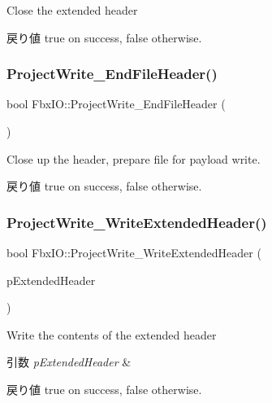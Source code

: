 Close the extended header \begin{DoxyReturn}{戻り値}
{\ttfamily true} on success, {\ttfamily false} otherwise. 
\end{DoxyReturn}
\mbox{\label{class_fbx_i_o_a577f707fb403e1fb1c865a079e48251f}} 
\subsubsection{\texorpdfstring{Project\+Write\+\_\+\+End\+File\+Header()}{ProjectWrite\_EndFileHeader()}}
{\footnotesize\ttfamily bool Fbx\+I\+O\+::\+Project\+Write\+\_\+\+End\+File\+Header (\begin{DoxyParamCaption}{ }\end{DoxyParamCaption})}

Close up the header, prepare file for payload write. \begin{DoxyReturn}{戻り値}
{\ttfamily true} on success, {\ttfamily false} otherwise. 
\end{DoxyReturn}
\mbox{\label{class_fbx_i_o_a0a8834ee86d5f7709aaf85e835b0dc50}} 
\subsubsection{\texorpdfstring{Project\+Write\+\_\+\+Write\+Extended\+Header()}{ProjectWrite\_WriteExtendedHeader()}}
{\footnotesize\ttfamily bool Fbx\+I\+O\+::\+Project\+Write\+\_\+\+Write\+Extended\+Header (\begin{DoxyParamCaption}\item[{const \hyperlink{class_fbx_i_o_file_header_info}{Fbx\+I\+O\+File\+Header\+Info} $\ast$}]{p\+Extended\+Header }\end{DoxyParamCaption})}

Write the contents of the extended header 
\begin{DoxyParams}{引数}
{\em p\+Extended\+Header} & \\
\hline
\end{DoxyParams}
\begin{DoxyReturn}{戻り値}
{\ttfamily true} on success, {\ttfamily false} otherwise. 
\end{DoxyReturn}
\mbox{\label{class_fbx_i_o_a8de78a369702272e272acebc07b91d26}} 
